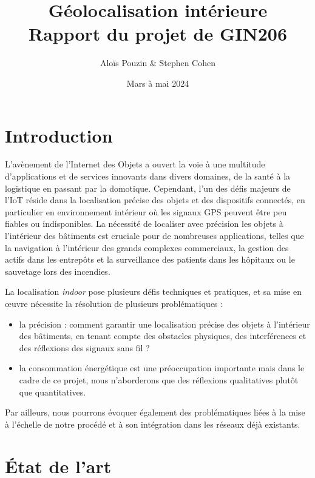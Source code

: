 \documentclass[french, a4paper, 12pt, parskip]{scrartcl}
\author{Aloïs Pouzin \& Stephen Cohen}
\title{%
  Géolocalisation intérieure\\
  \large
  Rapport du projet de GIN206}
\date{Mars à mai 2024}
\begin{document}
\maketitle

\tableofcontents

\section{Introduction}

L'avènement de l'Internet des Objets a ouvert la voie à une multitude
d'applications et de services innovants dans divers domaines, de la santé à la
logistique en passant par la domotique. Cependant, l'un des défis majeurs de
l'IoT réside dans la localisation précise des objets et des dispositifs
connectés, en particulier en environnement intérieur où les signaux GPS peuvent
être peu fiables ou indisponibles. La nécessité de localiser avec précision les
objets à l'intérieur des bâtiments est cruciale pour de nombreuses applications,
telles que la navigation à l'intérieur des grands complexes commerciaux, la
gestion des actifs dans les entrepôts et la surveillance des patients dans les
hôpitaux ou le sauvetage lors des incendies.

La localisation \textit{indoor} pose plusieurs défis techniques et pratiques,
et sa mise en œuvre nécessite la résolution de plusieurs problématiques :
\begin{itemize}
\item
  la précision : comment garantir une localisation précise des objets à
    l'intérieur des bâtiments, en tenant compte des obstacles physiques, des
    interférences et des réflexions des signaux sans fil ?
\item
  la consommation énergétique est une préoccupation importante mais dans le
    cadre de ce projet, nous n'aborderons que des réflexions qualitatives
    plutôt que quantitatives.
\end{itemize}

Par ailleurs, nous pourrons évoquer également des problématiques liées à la mise
à l'échelle de notre procédé et à son intégration dans les réseaux déjà
existants.

\section{État de l'art}
\end{document}
